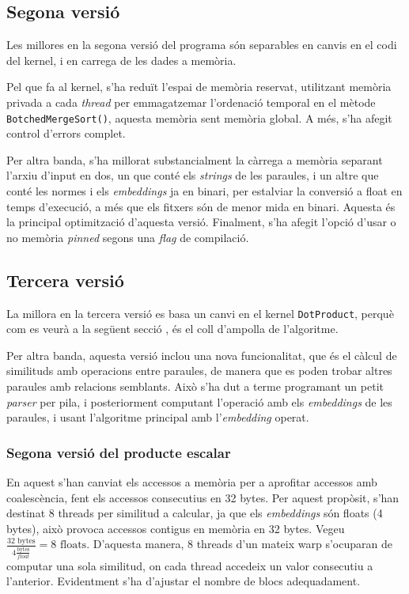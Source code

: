 \documentclass[catalan,10pt,a4paper]{article}
\begin{document}
\subsection*{Segona versió}
Les millores en la segona versió del programa són separables en canvis en el codi del kernel, i en carrega de les dades a memòria.

Pel que fa al kernel, s'ha reduït l'espai de memòria reservat, utilitzant memòria privada a cada \textit{thread} per emmagatzemar l'ordenació temporal en el mètode \verb|BotchedMergeSort()|, aquesta memòria sent memòria global. A més, s'ha afegit control d'errors complet.

Per altra banda, s'ha millorat substancialment la càrrega a memòria separant l'arxiu d'input en dos, un que conté els \textit{strings} de les paraules, i un altre que conté les normes i els \textit{embeddings} ja en binari, per estalviar la conversió a float en temps d'execució, a més que els fitxers són de menor mida en binari. Aquesta és la principal optimització d'aquesta versió.
Finalment, s'ha afegit l'opció d'usar o no memòria \textit{pinned} segons una \textit{flag} de compilació.
\subsection*{Tercera versió}\label{sec:v3}
La millora en la tercera versió es basa un canvi en el kernel \verb|DotProduct|, perquè com es veurà a la següent secció , és el coll d'ampolla de l'algoritme. 

Per altra banda, aquesta versió inclou una nova funcionalitat, que és el càlcul de similituds amb operacions entre paraules, de manera que es poden trobar altres paraules amb relacions semblants. Això s'ha dut a terme programant un petit \textit{parser} per pila, i posteriorment computant l'operació amb els \textit{embeddings} de les paraules, i usant l'algoritme principal amb l'\textit{embedding} operat. 
\subsubsection*{Segona versió del producte escalar}
En aquest s'han canviat els accessos a memòria per a aprofitar accessos amb coalescència, fent els accessos consecutius en 32 bytes. Per aquest propòsit, s'han destinat 8 threads per similitud a calcular, ja que els \textit{embeddings} són floats (4 bytes), això provoca accessos contigus en memòria en 32 bytes. Vegeu $\frac{32 \text{ bytes}}{4 \frac{\text{bytes}}{float}} = 8 \text{ floats}$. D'aquesta manera, 8 threads d'un mateix warp s'ocuparan de computar una sola similitud, on cada thread accedeix un valor consecutiu a l'anterior. Evidentment s'ha d'ajustar el nombre de blocs adequadament.
\end{document}
